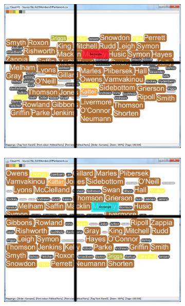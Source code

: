 \begin{figure}[!htb]
\centering
\begin{subfigure}{.5\textwidth}
  \centering
  \includegraphics[scale=0.25]{Experiment2/T1/M3Spiral.png}
\end{subfigure}%
\begin{subfigure}{.5\textwidth}
  \centering
 \includegraphics[scale=0.25]{Experiment2/T1/M3Typewriter.png}
\end{subfigure}
\begin{subfigure}{.5\textwidth}
  \centering

\end{subfigure}
\end{figure}
